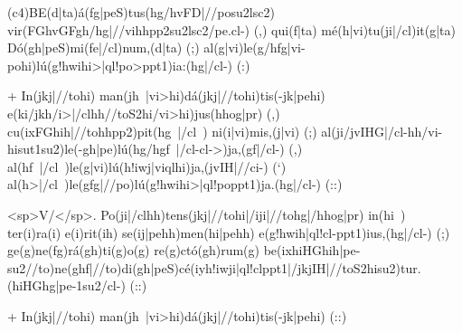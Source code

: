 (c4)BE(d|ta)á(fg|peS)tus(hg/hvFD|//posu2lsc2) vir(FGhvGFgh/hg|//vihhpp2su2lsc2/pe.cl-) (,) 
qui(f|ta) mé(h|vi)tu(ji|/cl)it(g|ta) Dó(gh|peS)mi(fe|/cl)num,(d|ta) (;) 
al(g|vi)le(g/hfg|vi-pohi)lú(g!hwihi>|ql!po>ppt1)ia:(hg|/cl-) (:)

+ 
In(jkj|//tohi) man(jh~|vi>hi)dá(jkj|//tohi)tis(-jk|pehi) e(ki/jkh/i>|/clhh//toS2hi/vi>hi)jus(hhog|pr) (,) 
cu(ixFGhih|//tohhpp2)pit(hg~|/cl~) ni(i|vi)mis,(j|vi) (;) 
al(ji/jvIHG|/cl-hh/vi-hisut1su2)le(-gh|pe)lú(hg/hgf~|/cl-cl->)ja,(gf|/cl-) (,) 
al(hf~|/cl~)le(g|vi)lú(h!iwj|viqlhi)ja,(jvIH|//ci-) (`) al(h>|/cl~)le(gfg|//po)lú(g!hwihi>|ql!poppt1)ja.(hg|/cl-) (::)  

<sp>V/</sp>. 
Po(ji|/clhh)tens(jkj|//tohi|/iji|//tohg|/hhog|pr) in(hi~) ter(i)ra(i) e(i)rit(ih) se(ij|pehh)men(hi|pehh) e(g!hwih|ql!cl-ppt1)ius,(hg|/cl-) (;)
ge(g)ne(fg)rá(gh)ti(g)o(g) re(g)ctó(gh)rum(g) 
be(ixhiHGhih|pe-su2//to)ne(ghf|//to)di(gh|peS)cé(iyh!iwji|ql!clppt1|/jkjIH|//toS2hisu2)tur.(hiHGhg|pe-1su2/cl-) (::)

+ 
In(jkj|//tohi) man(jh~|vi>hi)dá(jkj|//tohi)tis(-jk|pehi) (::)